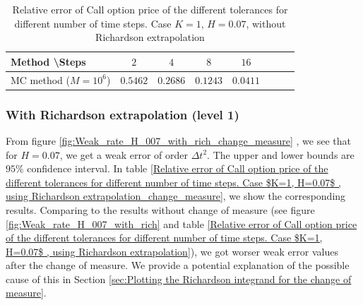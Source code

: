 \documentclass[11pt]{article}
\begin{document}
\begin{table}[h!]
	\centering
	\begin{tabular}{l*{6}{c}r}
		Method \textbackslash  Steps            & $2$ & $4$ & $8$ & $16$ &   \\
		\hline
		
		MC method ($M=10^{6}$)   & $\mathbf{0.5462}$  & $\mathbf{0.2686}$  & $\mathbf{0.1243}$ & $\mathbf{0.0411}$  \\	
		\hline
	\end{tabular}
	\caption{Relative error of Call option price of the different tolerances for different number of time steps. Case $K=1$, $H=0.07$, without Richardson extrapolation}
	\label{Relative error of Call option price of the different tolerances for different number of time steps. Case $K=1, H=0.07$_change_measure}
\end{table}


\newpage
\subsubsection*{With Richardson extrapolation (level 1)}
From figure \ref{fig:Weak_rate_H_007_with_rich_change_measure} , we see that  for $H=0.07$, we get a weak error of order $\Delta t^2$. The upper and lower bounds are $95\%$ confidence interval. In table \ref{Relative error of Call option price of the different tolerances for different number of time steps. Case $K=1, H=0.07$ , using Richardson extrapolation_change_measure}, we show the corresponding results. Comparing to the results without change of measure (see figure \ref{fig:Weak_rate_H_007_with_rich} and table \ref{Relative error of Call option price of the different tolerances for different number of time steps. Case $K=1, H=0.07$ , using Richardson extrapolation}),  we got worser weak error values after the change of measure. We provide a potential explanation of the possible cause of this in Section \ref{sec:Plotting the Richardson integrand for the change of measure}.
\end{document}
